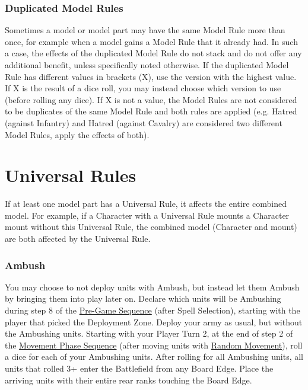 \subsubsection{Duplicated Model Rules}

Sometimes a model or model part may have the same Model Rule more than once, for example when a model gains a Model Rule that it already had. In such a case, the effects of the duplicated Model Rule do not stack and do not offer any additional benefit, unless specifically noted otherwise. If the duplicated Model Rule has different values in brackets (X), use the version with the highest value. If X is the result of a dice roll, you may instead choose which version to use (before rolling any dice). If X is not a value, the Model Rules are not considered to be duplicates of the same Model Rule and both rules are applied (e.g. Hatred (against Infantry) and Hatred (against Cavalry) are considered two different Model Rules, apply the effects of both).

\section{Universal Rules}
\label{universal_rules}

If at least one model part has a Universal Rule, it affects the entire combined model. For example, if a Character with a Universal Rule mounts a Character mount without this Universal Rule, the combined model (Character and mount) are both affected by the Universal Rule.

\subsubsection{Ambush}
\label{ambush}

You may choose to not deploy units with Ambush, but instead let them Ambush by bringing them into play later on. Declare which units will be Ambushing during step 8 of the \hyperref[the_pre_game_sequence]{Pre-Game Sequence} (after Spell Selection), starting with the player that picked the Deployment Zone. Deploy your army as usual, but without the Ambushing units. Starting with your Player Turn 2, at the end of step 2 of the \hyperref[the_movement_phase_sequence]{Movement Phase Sequence} (after moving units with \hyperref[random_movement]{Random Movement}), roll a dice for each of your Ambushing units. After rolling for all Ambushing units, all units that rolled 3+ enter the Battlefield from any Board Edge. Place the arriving units with their entire rear ranks touching the Board Edge.

